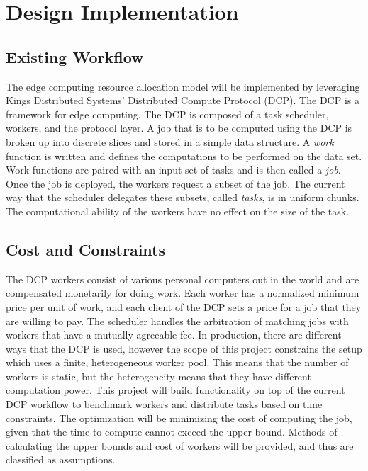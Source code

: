 \documentclass[../mthe-493-project-proposal.tex]{subfiles}
\begin{document}
    \section{Design Implementation}
    \subsection{Existing Workflow}

    The edge computing resource allocation model will be implemented by leveraging  Kings Distributed Systems' Distributed Compute Protocol (DCP). The DCP is a framework for edge computing. The DCP is composed of a task scheduler, workers, and the protocol layer. A job that is to be computed using the DCP is broken up into discrete slices and stored in a simple data structure. A \emph{work} function is written and defines the computations to be performed on the data set. Work functions are paired with an input set of tasks and is then called a \emph{job}. Once the job is deployed, the workers request a subset of the job. The current way that the scheduler delegates these subsets, called \emph{tasks}, is in uniform chunks. The computational ability of the workers have no effect on the size of the task.

    \subsection{Cost and Constraints}
    \label{ssec:costs-and-constraints}

    The DCP workers consist of various personal computers out in the world and are compensated monetarily for doing work. Each worker has a normalized minimum price per unit of work, and each client of the DCP sets a price for a job that they are willing to pay. The scheduler handles the arbitration of matching jobs with workers that have a mutually agreeable fee. In production, there are different ways that the DCP is used, however the scope of this project constrains the setup which uses a finite, heterogeneous worker pool. This means that the number of workers is static, but the heterogeneity means that they have different computation power. This project will build functionality on top of the current DCP workflow to benchmark workers and distribute tasks based on time constraints. The optimization will be minimizing the cost of computing the job, given that the time to compute cannot exceed the upper bound. Methods of calculating the upper bounds and cost of workers will be provided, and thus are classified as assumptions.
\end{document}
